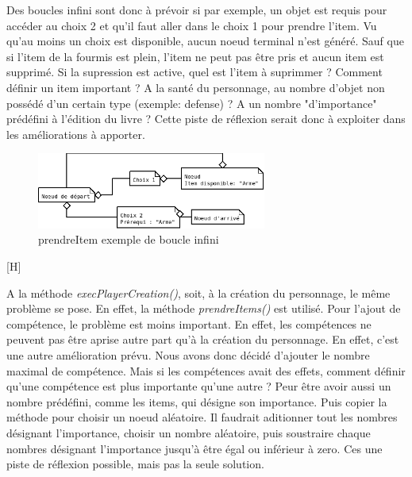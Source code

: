 			Des boucles infini sont donc à prévoir si par exemple, un objet est requis pour accéder au choix 2 et qu'il faut aller dans le choix 1 pour prendre l'item. Vu qu'au moins un choix est disponible, aucun noeud terminal n'est généré. Sauf que si l'item de la fourmis est plein, l'item ne peut pas être pris et aucun item est supprimé. Si la supression est active, quel est l'item à suprimmer ? Comment définir un item important ? A la santé du personnage, au nombre d'objet non possédé d'un certain type (exemple: defense) ? A un nombre "d'importance" prédéfini à l'édition du livre ? Cette piste de réflexion serait donc à exploiter dans les améliorations à apporter.

			\begin{figure}[H]
				\centering\includegraphics[height=2.5cm, keepaspectratio]{img/fourmisPrendreItemInfiniExemple.png}
				\caption{prendreItem exemple de boucle infini}
			\end{figure}[H]

			A la méthode \textit{execPlayerCreation()}, soit, à la création du personnage, le même problème se pose. En effet, la méthode \textit{prendreItems()} est utilisé. Pour l'ajout de compétence, le problème est moins important. En effet, les compétences ne peuvent pas être aprise autre part qu'à la création du personnage. En effet, c'est une autre amélioration prévu. Nous avons donc décidé d'ajouter le nombre maximal de compétence. Mais si les compétences avait des effets, comment définir qu'une compétence est plus importante qu'une autre ? Peur être avoir aussi un nombre prédéfini, comme les items, qui désigne son importance. Puis copier la méthode pour choisir un noeud aléatoire. Il faudrait aditionner tout les nombres désignant l'importance, choisir un nombre aléatoire, puis soustraire chaque nombres désignant l'importance jusqu'à être égal ou inférieur à zero. Ces une piste de réflexion possible, mais pas la seule solution.

